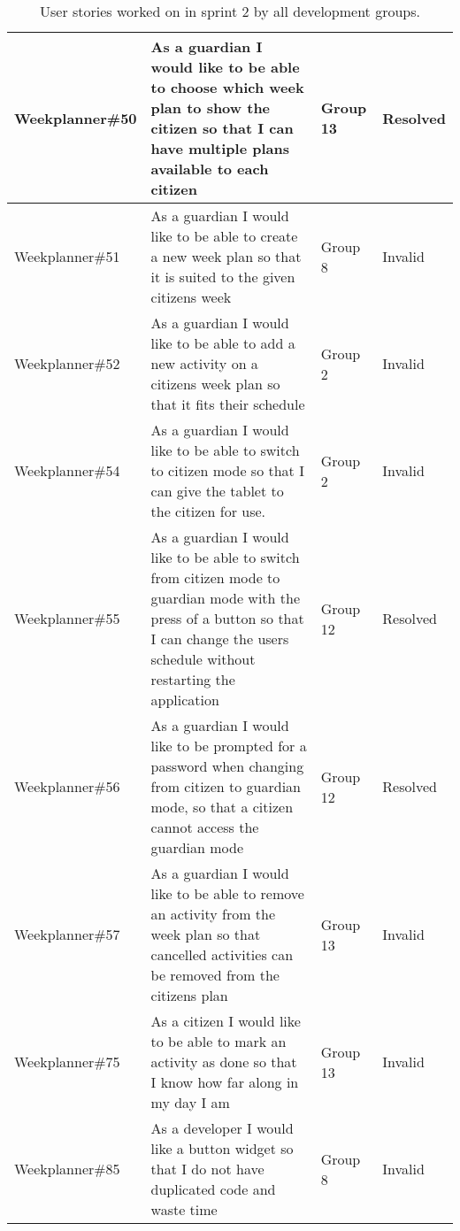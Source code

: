 \begin{table}[!ht]
\begin{tabular}{|p{2.8cm}|p{7cm}|p{1.5cm}|p{1.5cm}|}
    Weekplanner\#50 & As a guardian I would like to be able to choose which week plan to show the citizen so that I can have multiple plans available to each citizen                                          & Group 13        & Resolved\\ \hline
    Weekplanner\#51 & As a guardian I would like to be able to create a new week plan so that it is suited to the given citizens week                                                                          & Group 8         & Invalid    \\ \hline
    Weekplanner\#52 & As a guardian I would like to be able to add a new activity on a citizens week plan so that it fits their schedule                                                                       & Group 2         & Invalid    \\ \hline
    Weekplanner\#54 & As a guardian I would like to be able to switch to citizen mode so that I can give the tablet to the citizen for use.                                                                    & Group 2         & Invalid    \\ \hline
    Weekplanner\#55 & As a guardian I would like to be able to switch from citizen mode to guardian mode with the press of a button so that I can change the users schedule without restarting the application & Group 12        & Resolved    \\ \hline
    Weekplanner\#56 & As a guardian I would like to be prompted for a password when changing from citizen to guardian mode, so that a citizen cannot access the guardian mode                                  & Group 12        & Resolved    \\ \hline
    Weekplanner\#57 & As a guardian I would like to be able to remove an activity from the week plan so that cancelled activities can be removed from the citizens plan                                        & Group 13        & Invalid    \\ \hline
    Weekplanner\#75 & As a citizen I would like to be able to mark an activity as done so that I know how far along in my day I am                                                                             & Group 13        & Invalid    \\ \hline
    Weekplanner\#85 & As a developer I would like a button widget so that I do not have duplicated code and waste time                                                                                         & Group 8         & Invalid    \\ \hline
    \end{tabular}
    \caption{User stories worked on in sprint 2 by all development groups.}
\end{table}
